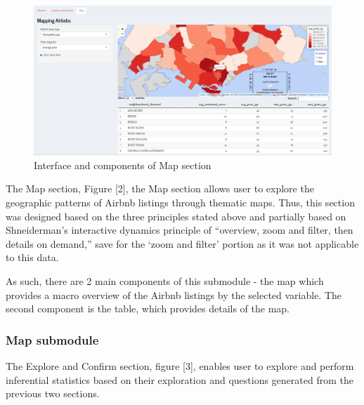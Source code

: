 \documentclass{acm_proc_article-sp}
\begin{document}
\begin{figure}[H]

{\centering \includegraphics[width=1\linewidth]{images/design_map} 

}

\caption{Interface and components of Map section}\label{fig:unnamed-chunk-2}
\end{figure}

The Map section, Figure {[}2{]}, the Map section allows user to explore
the geographic patterns of Airbnb listings through thematic maps. Thus,
this section was designed based on the three principles stated above and
partially based on Shneiderman's interactive dynamics principle of
``overview, zoom and filter, then details on demand,'' save for the
`zoom and filter' portion as it was not applicable to this data.

As such, there are 2 main components of this submodule - the map which
provides a macro overview of the Airbnb listings by the selected
variable. The second component is the table, which provides details of
the map.

\hypertarget{map-submodule-1}{%
\subsubsection{Map submodule}\label{map-submodule-1}}

The Explore and Confirm section, figure {[}3{]}, enables user to explore
and perform inferential statistics based on their exploration and
questions generated from the previous two sections.
\end{document}
